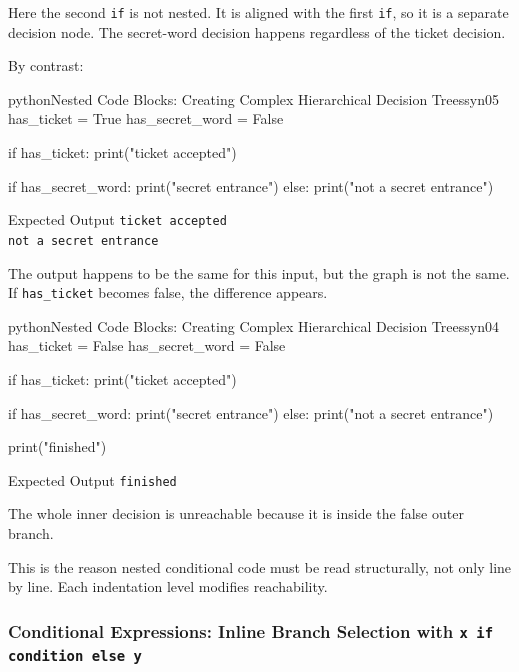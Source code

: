 Here the second \texttt{if} is not nested. It is aligned with the first \texttt{if}, so it is a separate decision node. The secret-word decision happens regardless of the ticket decision.

By contrast:

\begin{codebox}[]{python}{Nested Code Blocks: Creating Complex Hierarchical Decision Trees}{syn05}
has_ticket = True
has_secret_word = False

if has_ticket:
    print("ticket accepted")

    if has_secret_word:
        print("secret entrance")
    else:
        print("not a secret entrance")
\end{codebox}


\begin{iobox}{Expected Output}
\texttt{ticket accepted} \\
\texttt{not a secret entrance} \\
\end{iobox}


The output happens to be the same for this input, but the graph is not the same. If \texttt{has\_ticket} becomes false, the difference appears.

\begin{codebox}[]{python}{Nested Code Blocks: Creating Complex Hierarchical Decision Trees}{syn04}
has_ticket = False
has_secret_word = False

if has_ticket:
    print("ticket accepted")

    if has_secret_word:
        print("secret entrance")
    else:
        print("not a secret entrance")

print("finished")
\end{codebox}


\begin{iobox}{Expected Output}
\texttt{finished} \\
\end{iobox}


The whole inner decision is unreachable because it is inside the false outer branch.

This is the reason nested conditional code must be read structurally, not only line by line. Each indentation level modifies reachability.

\subsubsection{Conditional Expressions: Inline Branch Selection with \texttt{x if condition else y}}


